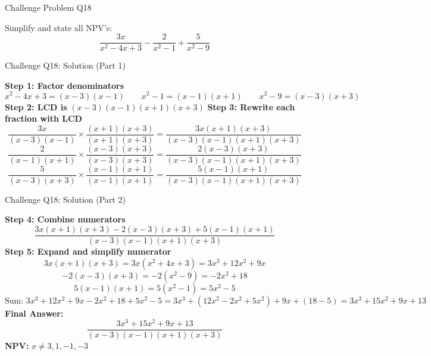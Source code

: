 \documentclass[aspectratio=169]{beamer}
\begin{document}
\begin{frame}{Challenge Problem Q18}
\begin{tcolorbox}[colback=lightgray,colframe=primary,title=Challenge Q18]
\footnotesize
Simplify and state all NPV's:
\[
\frac{3x}{x^2-4x+3} - \frac{2}{x^2-1} + \frac{5}{x^2-9}
\]
\end{tcolorbox}
\end{frame}

\begin{frame}{Challenge Q18: Solution (Part 1)}
\begin{tcolorbox}[colback=lightgray,colframe=accent,title=Step-by-Step Solution (Part 1)]
\footnotesize
\textbf{Step 1: Factor denominators}
\[
x^2-4x+3 = (x-3)(x-1)\qquad x^2-1 = (x-1)(x+1)\qquad x^2-9 = (x-3)(x+3)
\]
\textbf{Step 2: LCD is } $(x-3)(x-1)(x+1)(x+3)$
\textbf{Step 3: Rewrite each fraction with LCD}
\[
\frac{3x}{(x-3)(x-1)} \times \frac{(x+1)(x+3)}{(x+1)(x+3)} = \frac{3x(x+1)(x+3)}{(x-3)(x-1)(x+1)(x+3)}
\]
\[
\frac{2}{(x-1)(x+1)} \times \frac{(x-3)(x+3)}{(x-3)(x+3)} = \frac{2(x-3)(x+3)}{(x-3)(x-1)(x+1)(x+3)}
\]
\[
\frac{5}{(x-3)(x+3)} \times \frac{(x-1)(x+1)}{(x-1)(x+1)} = \frac{5(x-1)(x+1)}{(x-3)(x-1)(x+1)(x+3)}
\]
\end{tcolorbox}
\end{frame}

\begin{frame}{Challenge Q18: Solution (Part 2)}
\begin{tcolorbox}[colback=lightgray,colframe=accent,title=Step-by-Step Solution (Part 2)]
\footnotesize
\textbf{Step 4: Combine numerators}
\[
\frac{3x(x+1)(x+3) - 2(x-3)(x+3) + 5(x-1)(x+1)}{(x-3)(x-1)(x+1)(x+3)}
\]
\textbf{Step 5: Expand and simplify numerator}
\[
3x(x+1)(x+3) = 3x(x^2+4x+3) = 3x^3+12x^2+9x
\]
\[
-2(x-3)(x+3) = -2(x^2-9) = -2x^2+18
\]
\[
5(x-1)(x+1) = 5(x^2-1) = 5x^2-5
\]
\[
\text{Sum: } 3x^3 + 12x^2 + 9x - 2x^2 + 18 + 5x^2 - 5
= 3x^3 + (12x^2 - 2x^2 + 5x^2) + 9x + (18-5)
= 3x^3 + 15x^2 + 9x + 13
\]
\textbf{Final Answer:}
\[
\frac{3x^3 + 15x^2 + 9x + 13}{(x-3)(x-1)(x+1)(x+3)}
\]
\textbf{NPV:} $x \neq 3, 1, -1, -3$
\end{tcolorbox}
\end{frame}
\end{document}
